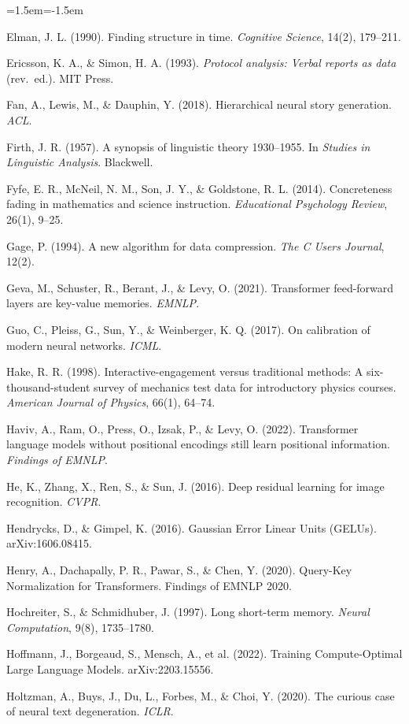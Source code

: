 \begin{list}{}{\leftmargin=1.5em\itemindent=-1.5em\itemsep=2pt\small}
\item Elman, J. L. (1990). Finding structure in time. \emph{Cognitive Science}, 14(2), 179--211.
\item Ericsson, K. A., \& Simon, H. A. (1993). \emph{Protocol analysis: Verbal reports as data} (rev.\ ed.). MIT Press.
\item Fan, A., Lewis, M., \& Dauphin, Y. (2018). Hierarchical neural story generation. \emph{ACL}.
\item Firth, J. R. (1957). A synopsis of linguistic theory 1930--1955. In \emph{Studies in Linguistic Analysis}. Blackwell.
\item Fyfe, E. R., McNeil, N. M., Son, J. Y., \& Goldstone, R. L. (2014). Concreteness fading in mathematics and science instruction. \emph{Educational Psychology Review}, 26(1), 9--25.
\item Gage, P. (1994). A new algorithm for data compression. \emph{The C Users Journal}, 12(2).
\item Geva, M., Schuster, R., Berant, J., \& Levy, O. (2021). Transformer feed-forward layers are key-value memories. \emph{EMNLP}.
\item Guo, C., Pleiss, G., Sun, Y., \& Weinberger, K. Q. (2017). On calibration of modern neural networks. \emph{ICML}.
\item Hake, R. R. (1998). Interactive-engagement versus traditional methods: A six-thousand-student survey of mechanics test data for introductory physics courses. \emph{American Journal of Physics}, 66(1), 64--74.
\item Haviv, A., Ram, O., Press, O., Izsak, P., \& Levy, O. (2022). Transformer language models without positional encodings still learn positional information. \emph{Findings of EMNLP}.
\item He, K., Zhang, X., Ren, S., \& Sun, J. (2016). Deep residual learning for image recognition. \emph{CVPR}.
\item Hendrycks, D., \& Gimpel, K. (2016). Gaussian Error Linear Units (GELUs). arXiv:1606.08415.
\item Henry, A., Dachapally, P. R., Pawar, S., \& Chen, Y. (2020). Query-Key Normalization for Transformers. Findings of EMNLP 2020.
\item Hochreiter, S., \& Schmidhuber, J. (1997). Long short-term memory. \emph{Neural Computation}, 9(8), 1735--1780.
\item Hoffmann, J., Borgeaud, S., Mensch, A., et al. (2022). Training Compute-Optimal Large Language Models. arXiv:2203.15556.
\item Holtzman, A., Buys, J., Du, L., Forbes, M., \& Choi, Y. (2020). The curious case of neural text degeneration. \emph{ICLR}.

\end{list}
